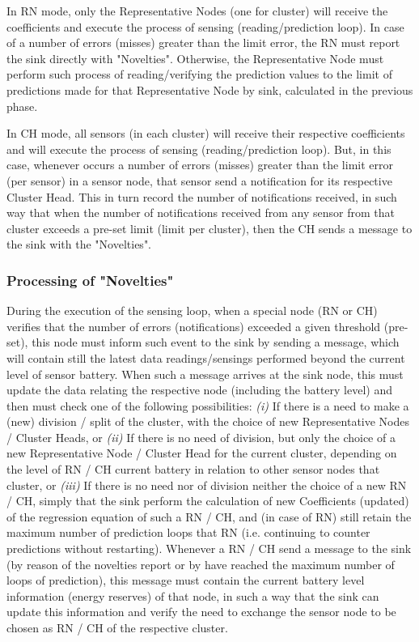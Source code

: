 \documentclass[conference]{IEEEtran}
\begin{document}
In RN mode, only the Representative Nodes (one for cluster) will receive the
coefficients and execute the process of sensing (reading/prediction loop).
In case of a number of errors (misses) greater than the limit error, the RN must
report the sink directly with "Novelties".
Otherwise, the Representative Node must perform such process of
reading/verifying the prediction values to the limit of predictions made for
that Representative Node by sink, calculated in the previous phase.

In CH mode, all sensors (in each cluster) will receive their respective
coefficients and will execute the process of sensing (reading/prediction loop).
But, in this case, whenever occurs a number of errors (misses) greater than the
limit error (per sensor) in a sensor node, that sensor send a
notification for its respective Cluster Head. This in turn record the number of
notifications received, in such way that when the number of notifications
received from any sensor from that cluster exceeds a pre-set limit (limit per
cluster), then the CH sends a message to the sink with the "Novelties".

\subsubsection{Processing of "Novelties"}

During the execution of the sensing loop, when a special node (RN or CH)
verifies that the number of errors (notifications) exceeded a given threshold
(pre-set), this node must inform such event to the sink by sending a message,
which will contain still the latest data readings/sensings performed beyond the
current level of sensor battery. 
When such a message arrives at the sink node, this must update
the data relating the respective node (including the battery level) and then
must check one of the following possibilities: {\it (i)} If there is a need to
make a (new) division / split of the cluster, with the choice of new
Representative Nodes / Cluster Heads, or {\it (ii)} If there is no need of
division, but only the choice of a new Representative Node / Cluster Head for
the current cluster, depending on the level of RN / CH current battery in
relation to other sensor nodes that cluster, or {\it (iii)} If there is no need
nor of division neither the choice of a new RN / CH, simply that the sink
perform the calculation of new Coefficients (updated) of the regression equation
of such a RN / CH, and (in case of RN) still retain the maximum number of
prediction loops that RN (i.e. continuing to counter predictions without
restarting).
Whenever a RN / CH send a message to the sink (by reason of the novelties report
or by have reached the maximum number of loops of prediction), this message must
contain the current battery level information (energy reserves) of that node, in
such a way that the sink can update this information and verify the need to
exchange the sensor node to be chosen as RN / CH of the respective cluster.
\end{document}
